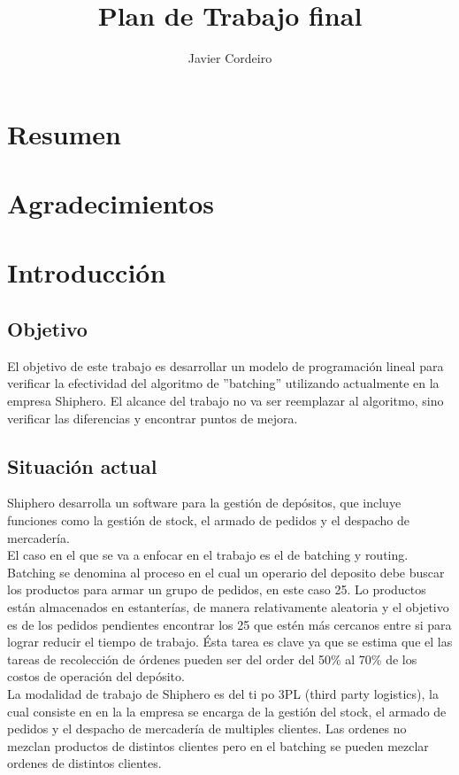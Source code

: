 \documentclass[a4paper,openany]{memoir}
\title{Plan de Trabajo final}
\subtitle{}
\author{Javier Cordeiro\hfill\the\year}
\begin{document}
    \frontmatter        %

    \mnfrontpage

\chapter{Resumen}


\chapter{Agradecimientos}

    \cleartorecto
    \tableofcontents    %
    \cleartorecto
    \mainmatter         %






\chapter{Introducción}

\section{Objetivo}
El objetivo de este trabajo es desarrollar un modelo de programación lineal para verificar la efectividad del algoritmo  de ''batching''  utilizando actualmente en la empresa Shiphero. El alcance del trabajo no va ser reemplazar al algoritmo, sino verificar las diferencias y encontrar puntos de mejora.   

\section{Situación actual}
Shiphero desarrolla un software para la gestión de depósitos, que incluye funciones como la gestión de stock, el armado de pedidos y el despacho de mercadería.\\
El caso en el que se va a enfocar en el trabajo es el de batching y routing. Batching se denomina al proceso en el cual un operario del deposito debe buscar los productos para armar un grupo de pedidos, en este caso 25. Lo productos están almacenados en estanterías, de manera relativamente aleatoria y el objetivo es de los pedidos pendientes encontrar los 25 que estén más cercanos entre si para lograr reducir el tiempo de trabajo. Ésta tarea es clave ya que se estima que el las tareas de recolección de órdenes pueden ser del order del 50\% al 70\% de los costos de operación del depósito.\\
La modalidad de trabajo de Shiphero es del ti po 3PL (third party logistics), la cual consiste en en la la empresa se encarga de la gestión del stock, el armado de pedidos y el despacho de mercadería de multiples clientes. Las ordenes no mezclan productos de distintos clientes pero en el batching se pueden mezclar ordenes de distintos clientes. 
\end{document}
